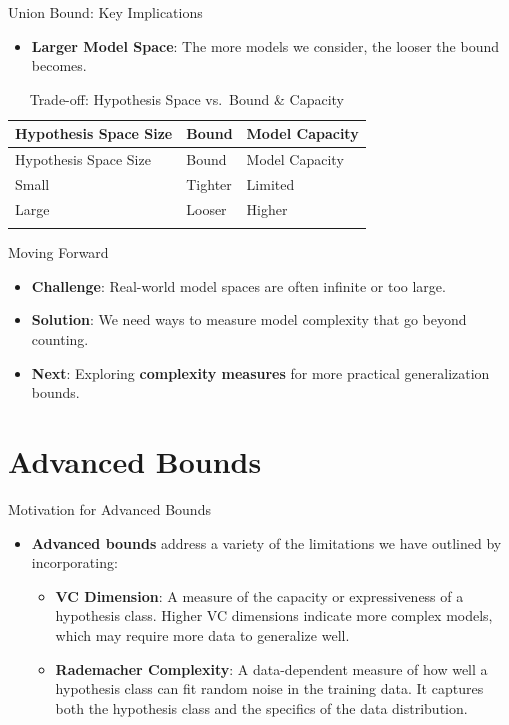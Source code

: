 \documentclass[
  ignorenonframetext,
]{beamer}
\providecommand{\tightlist}{%
  \setlength{\itemsep}{0pt}\setlength{\parskip}{0pt}}\usepackage{longtable,booktabs,array}
\begin{document}
\begin{frame}{Union Bound: Key Implications}
\label{union-bound-key-implications}
\begin{itemize}
\tightlist
\item
  \textbf{Larger Model Space}: The more models we consider, the looser
  the bound becomes.
\end{itemize}

\begin{longtable}[]{@{}lll@{}}
\caption{Trade-off: Hypothesis Space vs.~Bound \&
Capacity}\tabularnewline
\toprule\noalign{}
Hypothesis Space Size & Bound & Model Capacity \\
\midrule\noalign{}
\endfirsthead
\toprule\noalign{}
Hypothesis Space Size & Bound & Model Capacity \\
\midrule\noalign{}
\endhead
Small & Tighter & Limited \\
Large & Looser & Higher \\
\bottomrule\noalign{}
\end{longtable}
\end{frame}

\begin{frame}{Moving Forward}
\label{moving-forward}
\begin{itemize}
\tightlist
\item
  \textbf{Challenge}: Real-world model spaces are often infinite or too
  large.
\item
  \textbf{Solution}: We need ways to measure model complexity that go
  beyond counting.
\item
  \textbf{Next}: Exploring \textbf{complexity measures} for more
  practical generalization bounds.
\end{itemize}
\end{frame}

\section{Advanced Bounds}\label{advanced-bounds}

\begin{frame}{Motivation for Advanced Bounds}
\label{motivation-for-advanced-bounds}
\begin{itemize}
\tightlist
\item
  \textbf{Advanced bounds} address a variety of the limitations we have
  outlined by incorporating:

  \begin{itemize}
  \tightlist
  \item
    \textbf{VC Dimension}: A measure of the capacity or expressiveness
    of a hypothesis class. Higher VC dimensions indicate more complex
    models, which may require more data to generalize well.
  \item
    \textbf{Rademacher Complexity}: A data-dependent measure of how well
    a hypothesis class can fit random noise in the training data. It
    captures both the hypothesis class and the specifics of the data
    distribution.
  \end{itemize}
\end{itemize}
\end{frame}
\end{document}
